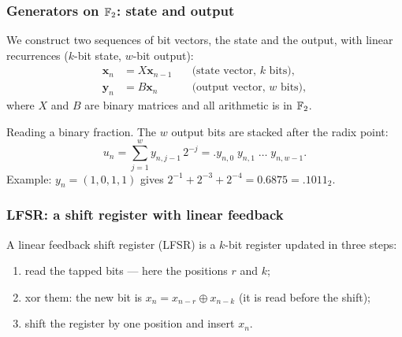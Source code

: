 \documentclass[aspectratio=169]{beamer}
\def\blue{\color{blue}}
\begin{document}
	\begin{frame}
		\frametitle{Generators on ${\mathbb{F}}_2$: state and output}
		
		We construct two sequences of bit vectors, the {\blue state} and the
		{\blue output}, with linear recurrences ($k$-bit state, $w$-bit output):
		\begin{align*}
			\boldsymbol{x}_n &= {X} \boldsymbol{x}_{n-1} & \quad \mbox{(state vector, $k$ bits)},\\
			\boldsymbol{y}_n &= {B} \boldsymbol{x}_{n}  & \quad \mbox{(output vector, $w$ bits)},
		\end{align*}
		where $X$ and $B$ are binary matrices and all arithmetic is in ${\mathbb{F}}_2$.
		
		\mbox{}
		
		{\blue Reading a binary fraction.} The $w$ output bits are stacked after the radix point:
		\[
			u_n = \sum_{j=1}^w y_{n,j-1}\, 2^{-j} = .y_{n,0}\; y_{n,1}\; \ldots\; y_{n,w-1}.
		\]
		Example: $y_n = (1,0,1,1)$ gives $2^{-1} + 2^{-3} + 2^{-4} = 0.6875 = .1011_2$.
		
	\end{frame}
	
	\begin{frame}
		\frametitle{LFSR: a shift register with linear feedback}
		
		\begin{minipage}{0.57\linewidth}
			A {\blue linear feedback shift register} (LFSR) is a $k$-bit register
			updated in three steps:
			\begin{enumerate}
				\item
				read the {\blue tapped bits} --- here the positions $r$ and $k$;
				\item
				{\blue xor} them: the new bit is $x_n = x_{n-r} \oplus x_{n-k}$
				(it is read before the shift);
				\item
				{\blue shift} the register by one position and insert $x_n$.
			\end{enumerate}
		\end{minipage}
		\hfill
		\begin{minipage}{0.40\linewidth}
			\begin{center}
			\end{center}
		\end{minipage}
		
	\end{frame}
	
\end{document}
